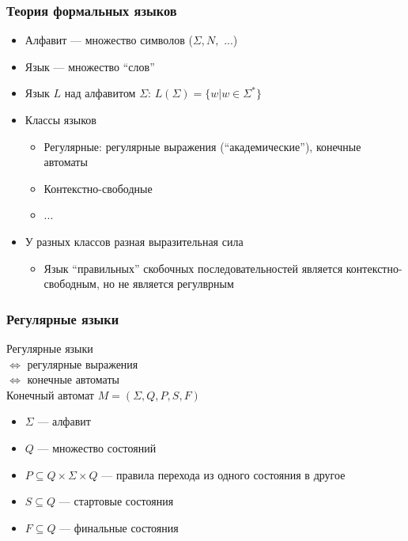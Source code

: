 \documentclass[xcolor=table,aspectratio=169]{beamer}
\begin{document}
\begin{frame}[fragile]
  \transwipe[direction=90]
  \frametitle{Теория формальных языков}
  \begin{itemize}
  \item Алфавит --- множество символов ($\Sigma, N,$ ...)
  \item Язык --- множество ``слов''
  \item Язык $L$ над алфавитом $\Sigma$: $L(\Sigma) = \{ w | w \in \Sigma^{*} \}$ 
  \item Классы языков
    \begin{itemize}
        \item Регулярные: регулярные выражения (``академические''), конечные автоматы
        \item Контекстно-свободные 
        \item ...
    \end{itemize}
  \item У разных классов разная выразительная сила
    \begin{itemize}
        \item Язык ``правильных'' скобочных последовательностей является контекстно-свободным, но не 
        является регулврным
    \end{itemize}
  \end{itemize}
\end{frame}

\begin{frame}[fragile]
  \transwipe[direction=90]
  \frametitle{Регулярные языки}
  Регулярные языки \\ $\Longleftrightarrow$ регулярные выражения \\ $\Longleftrightarrow$ конечные 
  автоматы \\
  Конечный автомат $M=(\Sigma,Q,P,S,F)$
      \begin{itemize}
        \item $\Sigma$ --- алфавит
        \item $Q$ --- множество состояний
        \item $P \subseteq Q \times \Sigma \times Q$ --- правила перехода из одного состояния в другое
        \item $S \subseteq Q$ --- стартовые состояния
        \item $F \subseteq Q$ --- финальные состояния
    \end{itemize}
\end{frame}
\end{document}
